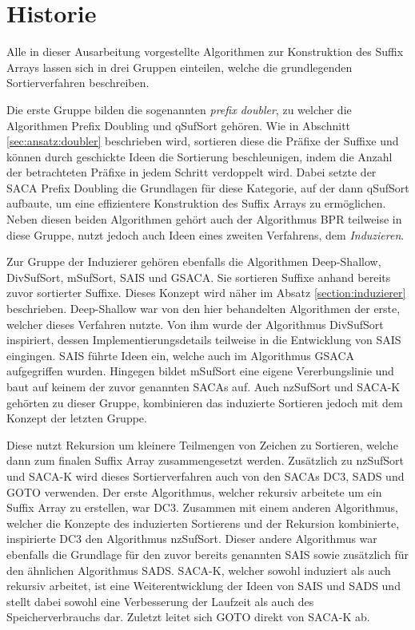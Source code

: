 \section{Historie}
Alle  in dieser Ausarbeitung vorgestellte Algorithmen zur Konstruktion des Suffix Arrays lassen sich in drei Gruppen einteilen, welche die grundlegenden Sortierverfahren beschreiben. \par
Die erste Gruppe bilden die sogenannten \textit{prefix doubler}, zu welcher die Algorithmen Prefix Doubling und qSufSort gehören.
Wie in Abschnitt \ref{sec:ansatz:doubler} beschrieben wird, sortieren diese die Präfixe der Suffixe und können durch geschickte Ideen die Sortierung beschleunigen, indem die Anzahl der betrachteten Präfixe in jedem Schritt verdoppelt wird. 
Dabei setzte der SACA Prefix Doubling die Grundlagen für diese Kategorie, auf der dann qSufSort aufbaute, um eine effizientere Konstruktion des Suffix Arrays zu ermöglichen. 
Neben diesen beiden Algorithmen gehört auch der Algorithmus BPR teilweise in diese Gruppe, nutzt jedoch auch Ideen eines zweiten Verfahrens, dem \textit{Induzieren}. \par

Zur Gruppe der Induzierer gehören ebenfalls die Algorithmen Deep-Shallow, DivSufSort, mSufSort, SAIS und GSACA.
Sie sortieren Suffixe anhand bereits zuvor sortierter Suffixe.
Dieses Konzept wird näher im Absatz \ref{section:induzierer} beschrieben.
Deep-Shallow war von den hier behandelten Algorithmen der erste, welcher dieses Verfahren nutzte.
Von ihm wurde der Algorithmus DivSufSort inspiriert, dessen Implementierungsdetails teilweise in die Entwicklung von SAIS eingingen.
SAIS führte Ideen ein, welche auch im Algorithmus GSACA aufgegriffen wurden.
Hingegen bildet mSufSort eine eigene Vererbungslinie und baut auf keinem der zuvor genannten SACAs auf.
Auch nzSufSort und SACA-K gehörten zu dieser Gruppe, kombinieren das induzierte Sortieren jedoch mit dem Konzept der letzten Gruppe. \par

Diese nutzt Rekursion um kleinere Teilmengen von Zeichen zu Sortieren, welche dann zum finalen Suffix Array zusammengesetzt werden.
Zusätzlich zu nzSufSort und SACA-K wird dieses Sortierverfahren auch von den SACAs DC3, SADS und GOTO verwenden. 
Der erste Algorithmus, welcher rekursiv arbeitete um ein Suffix Array zu erstellen, war DC3. 
Zusammen mit einem anderen Algorithmus, welcher die Konzepte des induzierten Sortierens und der Rekursion kombinierte, inspirierte DC3 den Algorithmus nzSufSort. 
Dieser andere Algorithmus war ebenfalls die Grundlage für den zuvor bereits genannten SAIS sowie zusätzlich für den ähnlichen Algorithmus SADS.
SACA-K, welcher sowohl induziert als auch rekursiv arbeitet, ist eine Weiterentwicklung der Ideen von SAIS und SADS und stellt dabei sowohl eine Verbesserung der Laufzeit als auch des Speicherverbrauchs dar.
Zuletzt leitet sich GOTO direkt von SACA-K ab. \par

